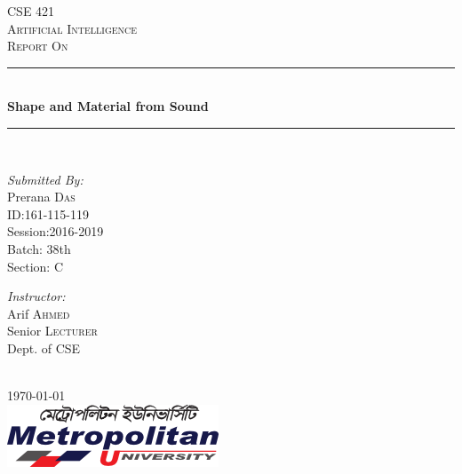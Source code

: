 \documentclass[12pt]{article}
\begin{document}
\begin{titlepage}
\newcommand{\HRule}{\rule{\linewidth}{0.1mm}} 
\center

\textsc{\Large CSE 421}\\[0.5cm] 
\textsc{\Large Artificial Intelligence}\\[0.5cm]
\textsc{\large Report On }\\[0.5cm] 

\HRule \\[0.4cm]
{ \huge \bfseries Shape and Material from Sound}\\[0.1cm] 
\HRule \\[1.5cm]
 

\begin{minipage}{0.4\textwidth}
\begin{flushleft} \large

\emph{Submitted By:}\\
Prerana \textsc{Das}\\
ID:161-115-119 \\ 
Session:2016-2019 \\
Batch: 38th\\
Section: C\\
\end{flushleft}
 


\end{minipage}
\begin{minipage}{0.4\textwidth}
\begin{flushright} \large
\emph{Instructor:} \\
Arif \textsc{Ahmed}\\ %
Senior \textsc{Lecturer}\\
Dept. of CSE\\
\end{flushright}
\end{minipage}\\[1cm]

 

{\large \today}\\[1cm] %
\includegraphics{logo.png}%
\vfill %

\end{titlepage}
\end{document}
